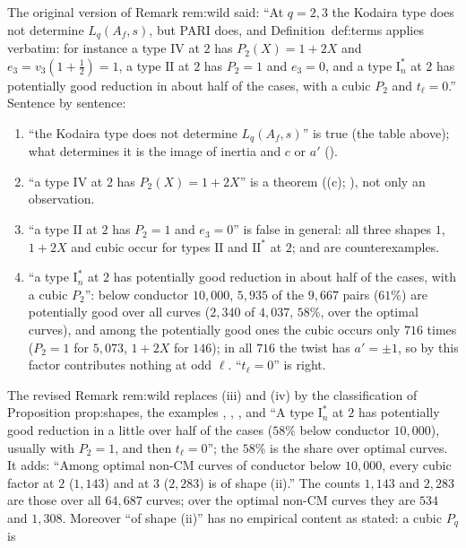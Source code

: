 \begin{remark}\label{rem:lfunctions:wild-status}
The original version of Remark rem:wild said: ``At $q=2,3$ the Kodaira type does not determine $L_q(A_f,s)$, but PARI does, and Definition~def:terms applies verbatim: for
instance a type $\mathrm{IV}$ at $2$ has $P_2(X)=1+2X$ and $e_3=v_3(1+\tfrac12)=1$, a type $\mathrm{II}$ at $2$ has $P_2=1$ and $e_3=0$, and a type $\mathrm I_n^*$ at $2$ has potentially good
reduction in about half of the cases, with a cubic $P_2$ and $t_\ell=0$.'' Sentence by sentence:
\begin{enumerate}[label=(\roman*)]
\item ``the Kodaira type does not determine $L_q(A_f,s)$'' is true (the table above); what determines it is the image of inertia and $c$ or $a'$
().
\item ``a type $\mathrm{IV}$ at $2$ has $P_2(X)=1+2X$'' is a theorem ((c); ), not only an observation.
\item ``a type $\mathrm{II}$ at $2$ has $P_2=1$ and $e_3=0$'' is false in general: all three shapes $1$, $1+2X$ and cubic occur for types $\mathrm{II}$ and $\mathrm{II}^*$ at $2$;  and
 are counterexamples.
\item ``a type $\mathrm I_n^*$ at $2$ has potentially good reduction in about half of the cases, with a cubic $P_2$'': below conductor $10{,}000$, $5{,}935$ of the $9{,}667$ pairs ($61\%$)
are potentially good over all curves ($2{,}340$ of $4{,}037$, $58\%$, over the optimal curves), and among the potentially good ones the cubic occurs only $716$ times ($P_2=1$
for $5{,}073$, $1+2X$ for $146$); in all $716$ the twist has $a'=\pm1$, so by  this factor contributes nothing at odd $\ell$. ``$t_\ell=0$'' is right.
\end{enumerate}
The revised Remark rem:wild replaces (iii) and (iv) by the classification of Proposition prop:shapes, the examples , , , and ``A type $\mathrm I_n^*$ at
$2$ has potentially good reduction in a little over half of the cases ($58\%$ below conductor $10{,}000$), usually with $P_2=1$, and then $t_\ell=0$''; the $58\%$ is the share
over optimal curves. It adds: ``Among optimal non-CM curves of conductor below $10{,}000$, every cubic factor at $2$ ($1{,}143$) and at $3$ ($2{,}283$) is of shape (ii).'' The
counts $1{,}143$ and $2{,}283$ are those over all $64{,}687$ curves; over the optimal non-CM curves they are $534$ and $1{,}308$. Moreover ``of shape (ii)'' has no empirical content as stated: a cubic $P_q$ is

\end{remark}
